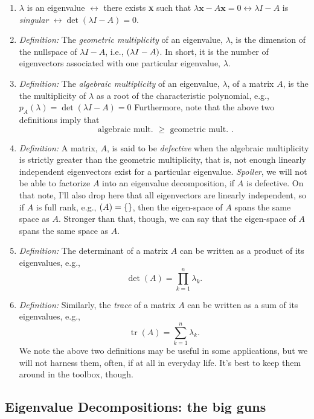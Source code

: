 \documentclass[paper=a4, fontsize=11pt]{scrartcl} %
\DeclareMathOperator{\tr}{tr}
\numberwithin{equation}{section} %
\numberwithin{figure}{section} %
\numberwithin{table}{section} %
\begin{document}
\begin{enumerate}
\item $\lambda$ is an eigenvalue $\leftrightarrow$ there exists \textbf{x} such that $\lambda\textbf{x}-A\textbf{x}=0 \leftrightarrow \lambda I-A$ is \emph{singular} $\leftrightarrow \det(\lambda I - A)=0$.
%
\item \emph{Definition:} The \emph{geometric multiplicity} of an eigenvalue, $\lambda$, is the dimension of the nullspace of $\lambda I - A$, i.e., $\null(\lambda I - A)$. In short, it is the number of eigenvectors associated with one particular eigenvalue, $\lambda$.

\item \emph{Definition:} The \emph{algebraic multiplicity} of an eigenvalue, $\lambda$, of a matrix $A$, is the the multiplicity of $\lambda$ as a root of the characteristic polynomial, e.g., $p_A(\lambda) = \det(\lambda I - A) = 0$ Furthermore, note that the above two definitions imply that $$\mbox{ algebraic mult. } \geq \mbox{ geometric mult. }.$$

\item \emph{Definition:} A matrix, $A$, is said to be \emph{defective} when the algebraic multiplicity is strictly greater than the geometric multiplicity, that is, not enough linearly independent eigenvectors exist for a particular eigenvalue. \emph{Spoiler}, we will not be able to factorize $A$ into an eigenvalue decomposition, if $A$ is defective. On that note, I'll also drop here that all eigenvectors are linearly independent, so if $A$ is full rank, e.g., $\null(A)=\{ \}$, then the eigen-space of $A$ spans the same space as $A$. Stronger than that, though, we can say that the eigen-space of $A$ spans the same space as $A$.

\item \emph{Definition:} The determinant of a matrix $A$ can be written as a product of its eigenvalues, e.g., $$\det(A) = \prod_{k=1}^n \lambda_k.$$

\item \emph{Definition:} Similarly, the \emph{trace} of a matrix $A$ can be written as a sum of its eigenvalues, e.g., $$\tr(A) = \sum_{k=1}^n \lambda_k.$$ We note the above two definitions may be useful in some applications, but we will not harness them, often, if at all in everyday life. It's best to keep them around in the toolbox, though. 

\end{enumerate}


%
\subsection{Eigenvalue Decompositions: the big guns}
\end{document}
